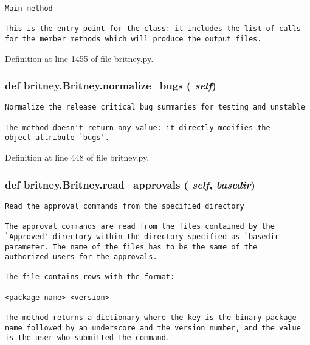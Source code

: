 \footnotesize\begin{verbatim}Main method

This is the entry point for the class: it includes the list of calls
for the member methods which will produce the output files.
\end{verbatim}
\normalsize
 

Definition at line 1455 of file britney.py.
\subsubsection{\setlength{\rightskip}{0pt plus 5cm}def britney.Britney.normalize\_\-bugs ( {\em self})}\label{classbritney_1_1Britney_5a6af4a100cfd54e872a27fa7f48ac3c}




\footnotesize\begin{verbatim}Normalize the release critical bug summaries for testing and unstable

The method doesn't return any value: it directly modifies the
object attribute `bugs'.
\end{verbatim}
\normalsize
 

Definition at line 448 of file britney.py.
\subsubsection{\setlength{\rightskip}{0pt plus 5cm}def britney.Britney.read\_\-approvals ( {\em self},  {\em basedir})}\label{classbritney_1_1Britney_39248f0cfea1c8798b2ca5a97d37eaf8}




\footnotesize\begin{verbatim}Read the approval commands from the specified directory

The approval commands are read from the files contained by the 
`Approved' directory within the directory specified as `basedir'
parameter. The name of the files has to be the same of the
authorized users for the approvals.

The file contains rows with the format:

<package-name> <version>

The method returns a dictionary where the key is the binary package
name followed by an underscore and the version number, and the value
is the user who submitted the command.
\end{verbatim}
\normalsize
 

